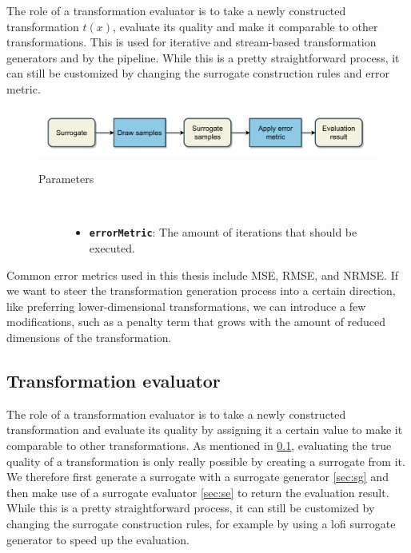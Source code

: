 \documentclass[
  a4paper,  %
  twoside,  %
  bibliography=totoc,
  headsepline,
  cleardoublepage=empty,
  parskip=half,
  draft=false
]{scrbook}
\begin{document}
The role of a transformation evaluator is to take a newly constructed transformation $t(x)$, evaluate its quality and make it comparable to other transformations.
This is used for iterative and stream-based transformation generators and by the pipeline.
While this is a pretty straightforward process, it can still be customized by changing the surrogate construction rules and error metric.

\begin{mdframed}[style=style,frametitle={Surrogate evaluator}]
\begin{figure}[H]
\includegraphics[width=\textwidth]{graphics/SurrogateEval.pdf}
\vspace{-4.5mm}

\delimit

\begin{description}
\item[Parameters] {~ \begin{itemize}[\indent{}]
\item \texttt{\textbf{errorMetric}}: The amount of iterations that should be executed.
\end{itemize}}
\end{description}

\delimit

\label{fig:se}
\end{figure}
\end{mdframed}

Common error metrics used in this thesis include MSE, RMSE, and NRMSE.
If we want to steer the transformation generation process into a certain direction, like preferring lower-dimensional transformations, we can introduce a few modifications, such as a penalty term that grows with the amount of reduced dimensions of the transformation.

\subsection {Transformation evaluator}
\label{sec:te}

The role of a transformation evaluator is to take a newly constructed transformation and evaluate its quality by assigning it a certain value to make it comparable to other transformations.
As mentioned in \cref{sec:te}, evaluating the true quality of a transformation is only really possible by creating a surrogate from it.
We therefore first generate a surrogate with a surrogate generator \cref{sec:sg} and then make use of a surrogate evaluator \cref{sec:se} to return the evaluation result.
While this is a pretty straightforward process, it can still be customized by changing the surrogate construction rules, for example by using a lofi surrogate generator to speed up the evaluation.
\end{document}
